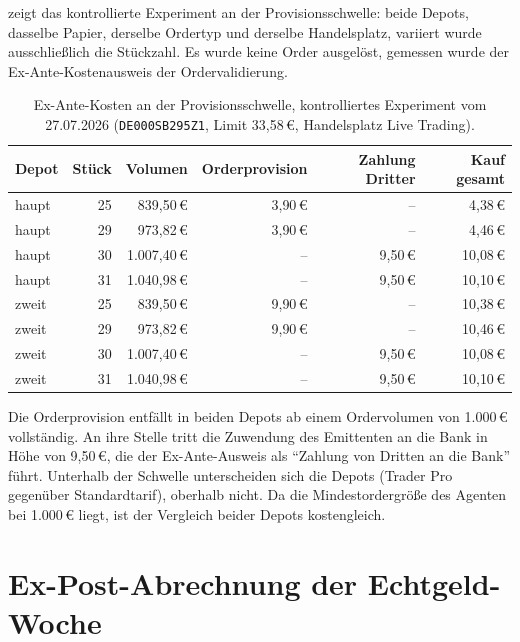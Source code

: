  zeigt das kontrollierte Experiment an der
Provisionsschwelle: beide Depots, dasselbe Papier, derselbe Ordertyp und derselbe
Handelsplatz, variiert wurde ausschließlich die Stückzahl. Es wurde keine Order
ausgelöst, gemessen wurde der Ex-Ante-Kostenausweis der Ordervalidierung.

\begin{table}[htbp]
  \centering
  \caption[Ex-Ante-Kosten an der Provisionsschwelle]{%
    Ex-Ante-Kosten an der Provisionsschwelle, kontrolliertes Experiment vom
    27.07.2026 (\texttt{DE000SB295Z1}, Limit 33{,}58\,€, Handelsplatz Live
    Trading).\quelleeigen}
  \label{tab:anhang-kostenklippe}
  \begin{tabular}{l r r r r r}
    \toprule
    Depot & Stück & Volumen & Orderprovision & Zahlung Dritter & Kauf gesamt \\
    \midrule
    haupt & 25 & 839{,}50\,€   & 3{,}90\,€ & --        & 4{,}38\,€  \\
    haupt & 29 & 973{,}82\,€   & 3{,}90\,€ & --        & 4{,}46\,€  \\
    haupt & 30 & 1.007{,}40\,€ & --        & 9{,}50\,€ & 10{,}08\,€ \\
    haupt & 31 & 1.040{,}98\,€ & --        & 9{,}50\,€ & 10{,}10\,€ \\
    \midrule
    zweit & 25 & 839{,}50\,€   & 9{,}90\,€ & --        & 10{,}38\,€ \\
    zweit & 29 & 973{,}82\,€   & 9{,}90\,€ & --        & 10{,}46\,€ \\
    zweit & 30 & 1.007{,}40\,€ & --        & 9{,}50\,€ & 10{,}08\,€ \\
    zweit & 31 & 1.040{,}98\,€ & --        & 9{,}50\,€ & 10{,}10\,€ \\
    \bottomrule
  \end{tabular}
\end{table}

Die Orderprovision entfällt in beiden Depots ab einem Ordervolumen von 1.000\,€
vollständig. An ihre Stelle tritt die Zuwendung des Emittenten an die Bank in Höhe von
9{,}50\,€, die der Ex-Ante-Ausweis als \enquote{Zahlung von Dritten an die Bank}
führt. Unterhalb der Schwelle unterscheiden sich die Depots (Trader Pro gegenüber
Standardtarif), oberhalb nicht. Da die Mindestordergröße des Agenten bei 1.000\,€
liegt, ist der Vergleich beider Depots kostengleich.

\section{Ex-Post-Abrechnung der Echtgeld-Woche}
\label{sec:anhang-abrechnung}


